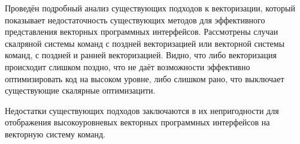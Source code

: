 Проведён подробный анализ существующих подходов к векторизации, который показывает недостаточность существующих методов для эффективного представления векторных программных интерфейсов. Рассмотрены случаи скалряной системы команд с поздней векторизацией или векторной системы команд, с поздней и ранней векторизацией. Видно, что либо векторизация происходит слишком поздно, что не даёт возможности эффективно оптимизировать код на высоком уровне, либо слишком рано, что выключает существующие скалярные оптимизацити.

Недостатки существующих подходов заключаются в их непригодности для отображения высокоуровневых векторных программных интерфейсов на векторную систему команд.

\FloatBarrier